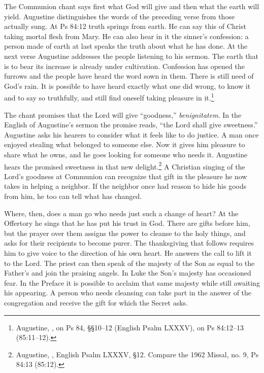 The Communion chant says first what God will give and then what the earth will yield. Augustine distinguishes the words of the preceding verse from those actually sung. At Ps 84:12 truth springs from earth. He can say this of Christ taking mortal flesh from Mary. He can also hear in it the sinner's confession: a person made of earth at last speaks the truth about what he has done. At the next verse Augustine addresses the people listening to his sermon. The earth that is to bear its increase is already under cultivation. Confession has opened the furrows and the people have heard the word sown in them. There is still need of God's rain. It is possible to have heard exactly what one did wrong, to know it and to say so truthfully, and still find oneself taking pleasure in it.\footnote{Augustine, , on Ps 84, §§10--12 (English Psalm LXXXV), on Ps 84:12--13 (85:11--12).}

The chant promises that the Lord will give ``goodness,'' \emph{benignitatem}. In the English of Augustine's sermon the promise reads, ``the Lord shall give sweetness.'' Augustine asks his hearers to consider what it feels like to do justice. A man once enjoyed stealing what belonged to someone else. Now it gives him pleasure to share what he owns, and he goes looking for someone who needs it. Augustine hears the promised sweetness in that new delight.\footnote{Augustine, , English Psalm LXXXV, §12. Compare the 1962 Missal, no. 9, Ps 84:13 (85:12).} A Christian singing of the Lord's goodness at Communion can recognize that gift in the pleasure he now takes in helping a neighbor. If the neighbor once had reason to hide his goods from him, he too can tell what has changed.

Where, then, does a man go who needs just such a change of heart? At the Offertory he sings that he has put his trust in God. There are gifts before him, but the prayer over them assigns the power to cleanse to the holy things, and asks for their recipients to become purer. The thanksgiving that follows requires him to give voice to the direction of his own heart. He answers the call to lift it to the Lord. The priest can then speak of the majesty of the Son as equal to the Father's and join the praising angels. In Luke the Son's majesty has occasioned fear. In the Preface it is possible to acclaim that same majesty while still awaiting his appearing. A person who needs cleansing can take part in the answer of the congregation and receive the gift for which the Secret asks.

